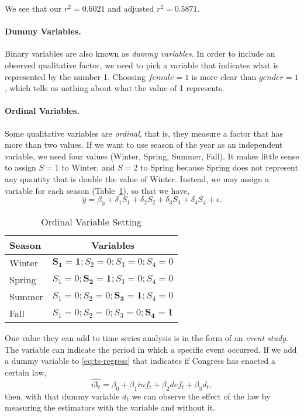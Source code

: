 We see that our $r^2=0.6021$ and adjusted $r^2=0.5871$.

\paragraph{Dummy Variables.}\label{dummy-variable}
Binary variables are also known as \emph{dummy variables}. In order to include an observed qualitative factor, we need to pick a variable that indicates what is represented by the number 1. Choosing $female=1$ is more clear than $gender=1$, which tells us nothing about what the value of 1 represents. %
\paragraph{Ordinal Variables.}Some qualitative variables are \emph{ordinal}, that is, they measure a factor that has more than two values. If we want to use season of the year as an independent variable, we need four values (Winter, Spring, Summer, Fall). It makes little sense to assign $S=1$ to Winter, and $S=2$ to Spring because Spring does not represent any quantity that is double the value of Winter.  Instead, we may assign a variable for each season (Table~\ref{tab:ord-variable}), so that we have,
\[
\hat{y} = \beta_0 + \delta_1 S_1 + \delta_2 S_2 + \delta_3 S_3 +\delta_4 S_4 + \epsilon.
\]

\begin{table}[tbp]
	\centering
	\begin{tabular}{lc}
	\toprule
	Season & Variables \\
	\hline
	Winter & $\mathbf{S_1=1}; S_2 = 0; S_3 = 0; S_4 = 0$ \\
	Spring & $S_1=0; \mathbf{S_2 = 1}; S_3 = 0; S_4 = 0$ \\
	Summer & $S_1=0; S_2 = 0; \mathbf{S_3 = 1}; S_4 = 0$ \\
	Fall & $S_1=0; S_2 = 0; S_3 = 0; \mathbf{S_4 = 1}$ \\
	\bottomrule
	\end{tabular}
   \caption{Ordinal Variable Setting}
   \label{tab:ord-variable}
\end{table}

One value they can add to time series analysis is in the form of an \emph{event study}. The variable can indicate the period in which a specific event occurred. If we add a dummy variable to \eqref{eq:ts-regress} that indicates if Congress has enacted a certain law,
\[
\widehat{i3_t} = \beta_0 + \beta_1 inf_t + \beta_2 def_t + \beta_3 d_t,
\]
then, with that dummy variable $d_t$ we can observe the effect of the law by measuring the estimators with the variable and without it.

